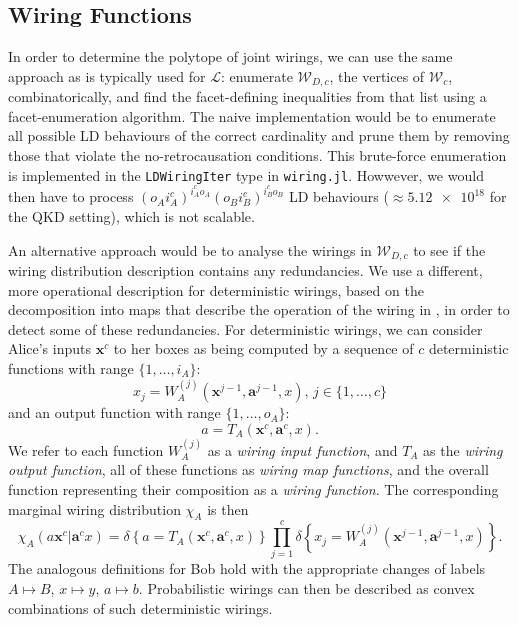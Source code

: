 \documentclass[10pt, a4paper]{article}
\numberwithin{equation}{section} %
\theoremstyle{definition}
\theoremstyle{plain}
\newcommand{\dintv}[2]{\mathopen\{#1,\ldots,#2\mathclose\}}
\newcommand{\?}{\mathrel{?}} %
\newcommand{\cvec}[1]{\boldsymbol{\mathbf{#1}}}    %
\newcommand{\indic}[1]{\delta{\left\{#1\right\}}} %
\newcommand{\sW}{\mathcal{W}}
\newcommand{\Ls}{\mathcal{L}}
\begin{document}
              \subsection{Wiring Functions}\label{sec:locwir_func}

              In order to determine the polytope of joint wirings, we can use the same approach as is typically used for \(\Ls\): enumerate \(\sW_{D,c}\), the vertices of \(\sW_c\), combinatorically, and find the facet-defining inequalities from that list using a facet-enumeration algorithm. The naive implementation would be to enumerate all possible LD behaviours of the correct cardinality and prune them by removing those that violate the no-retrocausation conditions. This brute-force enumeration is implemented in the \verb`LDWiringIter` type in \verb`wiring.jl`. Howwever, we would then have to process \({(o_A i_A^c)}^{i_A^c o_A} {(o_B i_B^c)}^{i_B^c o_B}\) LD behaviours (\(\approx \num{5.12e18}\) for the QKD setting), which is not scalable.

              An alternative approach would be to analyse the wirings in \(\sW_{D,c}\) to see if the wiring distribution description contains any redundancies. We use a different, more operational description for deterministic wirings, based on the decomposition into maps that describe the operation of the wiring in , in order to detect some of these redundancies.  For deterministic wirings, we can consider Alice's inputs \(\cvec{x}^c\) to her boxes as being computed by a sequence of \(c\) deterministic functions with range \(\dintv{1}{i_A}\):
              \begin{equation} x_j = W^{(j)}_{A}(\cvec{x}^{j-1}, \cvec{a}^{j-1}, x),\,j \in \dintv{1}{c} \end{equation}
              and an output function with range \(\dintv{1}{o_A}\):
              \begin{equation} a = T_{A}(\cvec{x}^{c}, \cvec{a}^{c}, x). \end{equation}
              We refer to each function \(W_{A}^{(j)}\) as a \emph{wiring input function}, and \(T_{A}\) as the \emph{wiring output function}, all of these functions as \emph{wiring map functions}, and the overall function representing their composition as a \emph{wiring function}. The corresponding marginal wiring distribution \(\chi_{A}\) is then
              \begin{equation}
                \chi_{A}(a\cvec{x}^c|\cvec{a}^cx) = \indic{a = T_{A}(\cvec{x}^{c}, \cvec{a}^{c}, x)} \prod_{j=1}^c \indic{x_j = W^{(j)}_{A}(\cvec{x}^{j-1}, \cvec{a}^{j-1}, x)}.
              \end{equation}
              The analogous definitions for Bob hold with the appropriate changes of labels \(A \mapsto B\), \(x \mapsto y\), \(a \mapsto b\). Probabilistic wirings can then be described as convex combinations of such deterministic wirings.
\end{document}
